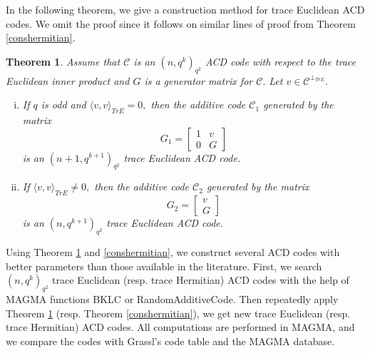 \documentclass[sn-mathphys-num]{sn-jnl}%
\theoremstyle{thmstyleone}%
\newtheorem{theorem}{Theorem}%
\theoremstyle{thmstyletwo}%
\theoremstyle{thmstylethree}%
\begin{document}
In the following theorem, we give a construction method for trace Euclidean ACD codes. We omit the proof since it follows on similar lines of proof from Theorem \ref{conshermitian}. 
\begin{theorem}\label{conseuclidean}
	Assume that $\mathcal{C}$ is an $(n,q^k)_{q^2}$ ACD code  with respect to the trace Euclidean inner product and $G$ is a  generator matrix for $\mathcal{C}.$  Let $v\in \mathcal{C}^{\perp_{TrE}} .$ 
	\begin{enumerate}[(i)]
		\item If $q$ is odd and $\langle v,v\rangle_{TrE}=0,$ then the additive code $\mathcal{C}_1$ generated by the matrix 
		$$G_1=\begin{bmatrix}
			1 & v\\
			0 & G
		\end{bmatrix}$$
		is an $(n+1,q^{k+1})_{q^2}$  trace Euclidean ACD code.
		\item  If $\langle v,v\rangle_{TrE}\neq 0,$ then the additive code $\mathcal{C}_2$ generated by the matrix 
		$$G_2=\begin{bmatrix}
			v\\
			G
		\end{bmatrix}$$
		is an $(n,q^{k+1})_{q^2}$  trace Euclidean ACD code.
	\end{enumerate}
\end{theorem}
Using Theorem \ref{conseuclidean} and  \ref{conshermitian}, we construct several ACD codes with better parameters than those available in the literature.  First, we search  $(n,q^k)_{q^2}$ trace Euclidean (resp. trace Hermitian) ACD codes with the help of MAGMA \cite{magma} functions {\selectfont
	BKLC} or  {\selectfont
	RandomAdditiveCode}. Then repeatedly apply  Theorem \ref{conseuclidean} (resp. Theorem \ref{conshermitian}), we get new trace Euclidean (resp. trace Hermitian) ACD codes. All computations are performed in MAGMA\cite{magma}, and we compare the codes with Grassl's code  table \cite{codetable} and the MAGMA database. 
\end{document}
